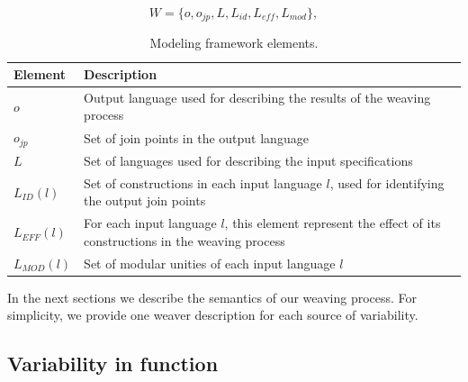 \documentclass{acm_proc_article-sp}
\begin{document}

\begin{equation}
W = \{o, o_{jp}, L, L_{id}, L_{eff}, L_{mod}\},
\label{eq:tuple}
\end{equation}

\begin{table}[h]
\begin{center}
\caption{Modeling framework elements.} \label{tab:tup-01}
\begin{tabular}{|p{0.6in}|p{2.4in}|}
  \hline
  {\bf Element} & {\bf Description} \\
   \hline
  $o$              & Output language used for describing the results of the weaving process \\ \hline
  $o_{jp}$       & Set of join points in the output language \\ \hline
  $L$              & Set of languages used for describing the input specifications \\ \hline
  $L_{ID}(l)$      & Set of constructions in each input language $l$, used for identifying the output join points \\ \hline
  $L_{EFF}(l)$   & For each input language $l$, this element represent the effect of its constructions in the weaving process \\ \hline
  $L_{MOD}(l)$  & Set of modular unities of each input language $l$\\
  \hline
\end{tabular}
\end{center}
\end{table}

In the next sections we describe the semantics of
our weaving process. For simplicity, we provide one weaver
description for each source of variability.

\subsection{Variability in function}\label{sub:pd-weaver}
\end{document}
